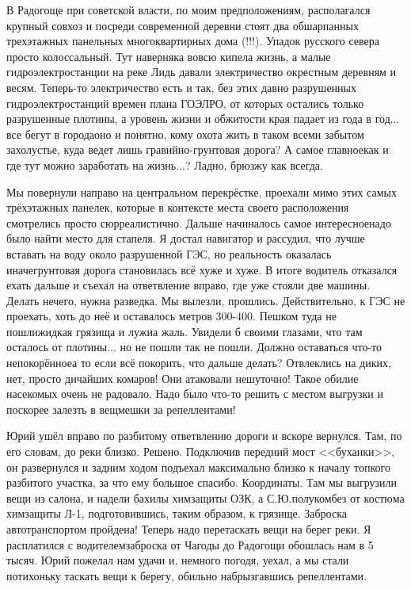 В Радогоще при советской власти, по моим предположениям, располагался крупный совхоз и посреди современной деревни стоят два обшарпанных трехэтажных панельных многоквартирных дома (!!!). Упадок русского севера просто колоссальный. Тут наверняка вовсю кипела жизнь, а малые гидроэлектростанции на реке Лидь давали электричество окрестным деревням и весям. Теперь-то электричество есть и так, без этих давно разрушенных гидроэлектростанций времен плана ГОЭЛРО, от которых остались только разрушенные плотины, а уровень жизни и обжитости края падает из года в год$\ldots$ все бегут в города\mdash оно и понятно, кому охота жить в таком всеми забытом захолустье, куда ведет лишь гравийно-грунтовая дорога? А самое главное\mdash как и где тут можно заработать на жизнь$\ldots$? Ладно, брюзжу как всегда. 

Мы повернули направо на центральном перекрёстке, проехали мимо этих самых трёхэтажных панелек, которые в контексте места своего расположения смотрелись просто сюрреалистично. Дальше начиналось самое интересное\mdash надо было найти место для стапеля. Я достал навигатор и рассудил, что лучше вставать на воду около разрушенной ГЭС, но реальность оказалась иначе\mdash грунтовая дорога становилась всё хуже и хуже. В итоге водитель отказался ехать дальше и съехал на ответвление вправо, где уже стояли две машины. Делать нечего, нужна разведка. Мы вылезли, прошлись. Действительно, к ГЭС не проехать, хоть до неё и оставалось метров 300-400. Пешком туда не пошли\mdash жидкая грязища и лужи\mdash а жаль. Увидели б своими глазами, что там осталось от плотины$\ldots$ но не пошли так не пошли. Должно оставаться что-то непокорённое\mdash а то если всё покорить, что дальше делать? Отвлеклись на диких, нет, просто дичайших комаров! Они атаковали нешуточно! Такое обилие насекомых очень не радовало. Надо было что-то решить с местом выгрузки и поскорее залезть в вещмешки за репеллентами!

Юрий ушёл вправо по разбитому ответвлению дороги и вскоре вернулся. Там, по его словам, до реки близко. Решено. Подключив передний мост <<буханки>>, он развернулся и задним ходом подъехал максимально близко к началу топкого разбитого участка, за что ему большое спасибо. Координаты\mdash \CoordsLidSeventeenStapel. Там мы выгрузили вещи из салона, и надели бахилы химзащиты ОЗК, а С.Ю.\mdash полукомбез от костюма химзащиты Л-1, подготовившись, таким образом, к грязище. Заброска автотранспортом пройдена! Теперь надо перетаскать вещи на берег реки. Я расплатился с водителем\mdash заброска от Чагоды до Радогощи обошлась нам в 5 тысяч. Юрий пожелал нам удачи и, немного погодя, уехал, а мы стали потихоньку таскать вещи к берегу, обильно набрызгавшись репеллентами.


